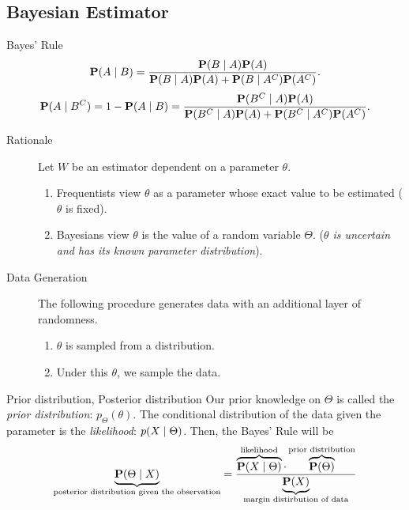 \subsection{Bayesian Estimator}
\begin{thm}{Bayes' Rule}
	\[\P(A\mid B)=\dfrac{\P(B\mid A)\P(A)}{\P(B\mid A)\P(A)+\P(B\mid A^C)\P(A^C)}.\]
	\[\P(A\mid B^C)=1-\P(A\mid B)=\dfrac{\P(B^C\mid A)\P(A)}{\P(B^C\mid A)\P(A)+\P(B^C\mid A^C)\P(A^C)}.\]	
\end{thm}
\begin{description}
	\item[Rationale] Let $W$ be an estimator dependent on a parameter $\theta$.
	\begin{enumerate}
		\item Frequentists view $\theta$ as a parameter whose exact value to be estimated (\textit{$\theta$} is fixed).
		\item Bayesians view $\theta$ is the value of a random variable $\Theta$. (\textit{$\theta$ is uncertain and has its known parameter distribution}).
	\end{enumerate}
	\item[Data Generation] The following procedure generates data with an additional layer of randomness.
	\begin{enumerate}
		\item $\theta$ is sampled from a distribution. 
		\item Under this $\theta$, we sample the data.
	\end{enumerate}
\end{description}
\begin{df}{Prior distribution, Posterior distribution}
	Our prior knowledge on $\Theta$ is called the \textit{prior distribution}: $p_\Theta(\theta)$. The conditional distribution of the data given the parameter is the \textit{likelihood}: $p\qty(X\mid\Theta)$. Then, the Bayes' Rule will be \[\underbrace{\P\qty(\Theta\mid X)}_\text{posterior distribution given the observation}=\dfrac{\overbrace{\P(X\mid\Theta)}^\text{likelihood}\cdot\overbrace{\P(\Theta)}^\text{prior distribution}}{\underbrace{\P(X)}_\text{margin distirbution of data}}\]	
\end{df}
